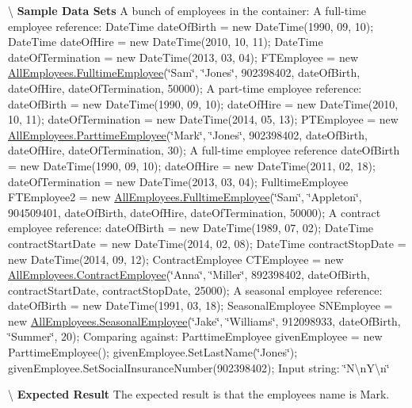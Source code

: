 \textbackslash{} {\bfseries  Sample Data Sets} A bunch of employees in the container\+: A full-\/time employee reference\+: Date\+Time date\+Of\+Birth = new Date\+Time(1990, 09, 10); Date\+Time date\+Of\+Hire = new Date\+Time(2010, 10, 11); Date\+Time date\+Of\+Termination = new Date\+Time(2013, 03, 04); F\+T\+Employee = new \hyperlink{class_all_employees_1_1_fulltime_employee}{All\+Employees.\+Fulltime\+Employee}(\char`\"{}\+Sam\char`\"{}, \char`\"{}\+Jones\char`\"{}, 902398402, date\+Of\+Birth, date\+Of\+Hire, date\+Of\+Termination, 50000); A part-\/time employee reference\+: date\+Of\+Birth = new Date\+Time(1990, 09, 10); date\+Of\+Hire = new Date\+Time(2010, 10, 11); date\+Of\+Termination = new Date\+Time(2014, 05, 13); P\+T\+Employee = new \hyperlink{class_all_employees_1_1_parttime_employee}{All\+Employees.\+Parttime\+Employee}(\char`\"{}\+Mark\char`\"{}, \char`\"{}\+Jones\char`\"{}, 902398402, date\+Of\+Birth, date\+Of\+Hire, date\+Of\+Termination, 30); A full-\/time employee reference date\+Of\+Birth = new Date\+Time(1990, 09, 10); date\+Of\+Hire = new Date\+Time(2011, 02, 18); date\+Of\+Termination = new Date\+Time(2013, 03, 04); Fulltime\+Employee F\+T\+Employee2 = new \hyperlink{class_all_employees_1_1_fulltime_employee}{All\+Employees.\+Fulltime\+Employee}(\char`\"{}\+Sam\char`\"{}, \char`\"{}\+Appleton\char`\"{}, 904509401, date\+Of\+Birth, date\+Of\+Hire, date\+Of\+Termination, 50000); A contract employee reference\+: date\+Of\+Birth = new Date\+Time(1989, 07, 02); Date\+Time contract\+Start\+Date = new Date\+Time(2014, 02, 08); Date\+Time contract\+Stop\+Date = new Date\+Time(2014, 09, 12); Contract\+Employee C\+T\+Employee = new \hyperlink{class_all_employees_1_1_contract_employee}{All\+Employees.\+Contract\+Employee}(\char`\"{}\+Anna\char`\"{}, \char`\"{}\+Miller\char`\"{}, 892398402, date\+Of\+Birth, contract\+Start\+Date, contract\+Stop\+Date, 25000); A seasonal employee reference\+: date\+Of\+Birth = new Date\+Time(1991, 03, 18); Seasonal\+Employee S\+N\+Employee = new \hyperlink{class_all_employees_1_1_seasonal_employee}{All\+Employees.\+Seasonal\+Employee}(\char`\"{}\+Jake\char`\"{}, \char`\"{}\+Williams\char`\"{}, 912098933, date\+Of\+Birth, \char`\"{}\+Summer\char`\"{}, 20); Comparing against\+: Parttime\+Employee given\+Employee = new Parttime\+Employee(); given\+Employee.\+Set\+Last\+Name(\char`\"{}\+Jones\char`\"{}); given\+Employee.\+Set\+Social\+Insurance\+Number(902398402); Input string\+: \char`\"{}\+N\textbackslash{}n\+Y\textbackslash{}n\char`\"{}

\textbackslash{} {\bfseries  Expected Result} The expected result is that the employee\textquotesingle{}s name is Mark.

